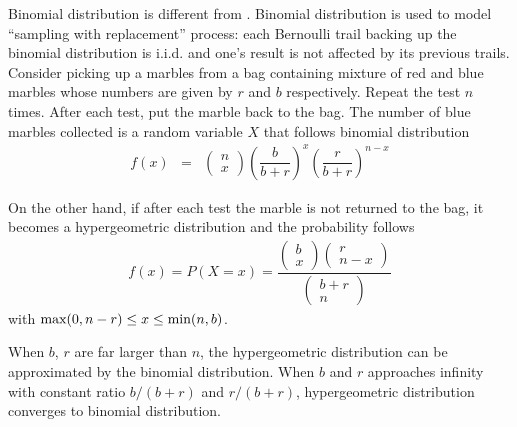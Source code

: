 Binomial distribution is different from . Binomial distribution is used to model ``sampling with replacement'' process: each Bernoulli trail backing up the binomial distribution is i.i.d. and one's result is not affected by its previous trails. Consider picking up a marbles from a bag containing mixture of red and blue marbles whose numbers are given by $r$ and $b$ respectively. Repeat the test $n$ times. After each test, put the marble back to the bag. The number of blue marbles collected is a random variable $X$ that follows binomial distribution
\begin{eqnarray}
f(x) &=& \left(\begin{array}{c}
                        n \\
                        x
                      \end{array}\right)\left(\dfrac{b}{b+r}\right)^x\left(\dfrac{r}{b+r}\right)^{n-x} \nonumber \nonumber
\end{eqnarray}

On the other hand, if after each test the marble is not returned to the bag, it becomes a hypergeometric distribution and the probability follows
\begin{eqnarray}
f(x) = P(X=x) = \dfrac{\left(\begin{array}{c}
                               b \\
                               x
                             \end{array}\right)\left(\begin{array}{c}
                                                       r \\
                                                       n-x
                                                     \end{array}\right)}{\left(\begin{array}{c}
                                                                                 b+r \\
                                                                                 n
                                                                               \end{array}\right)} \nonumber
\end{eqnarray}
with $\textup{max}(0, n-r) \leq x \leq \textup{min}(n, b)$.

When $b$, $r$ are far larger than $n$, the hypergeometric distribution can be approximated by the binomial distribution. When $b$ and $r$ approaches infinity with constant ratio $b/(b+r)$ and $r/(b+r)$, hypergeometric distribution converges to binomial distribution.

